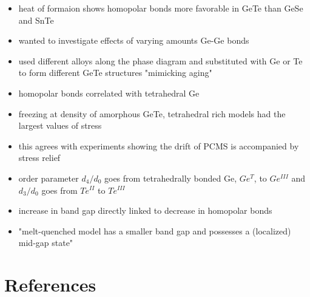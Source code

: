 \documentclass[3p,review,12pt]{elsarticle}
\begin{document}
\begin{itemize}
\begin{itemize}
		\item heat of formaion shows homopolar bonds more favorable in GeTe than GeSe and SnTe
		\item wanted to investigate effects of varying amounts Ge-Ge bonds
		\item used different alloys along the phase diagram and substituted with Ge or Te to form different GeTe structures "mimicking aging"
		\item homopolar bonds correlated with tetrahedral Ge
		\item freezing at density of amorphous GeTe, tetrahedral rich models had the largest values of stress
		\item this agrees with experiments showing the drift of PCMS is accompanied by stress relief
		\item order parameter $d_{4}/d_{0}$ goes from tetrahedrally bonded Ge, $Ge^{T}$, to $Ge^{III}$ and $d_{3}/d_{0}$ goes from $Te^{II}$ to $Te^{III}$
		\item increase in band gap directly linked to decrease in homopolar bonds
		\item "melt-quenched model has a smaller band gap and possesses a (localized) mid-gap state"
	\end{itemize}	
\end{itemize}


\section*{References}



\end{document}

